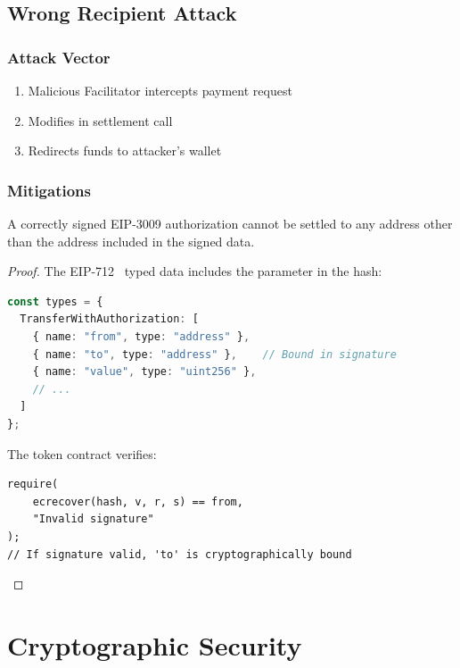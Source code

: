 \subsection{Wrong Recipient Attack}

\subsubsection{Attack Vector}

\begin{enumerate}
    \item Malicious Facilitator intercepts payment request
    \item Modifies  in settlement call
    \item Redirects funds to attacker's wallet
\end{enumerate}

\subsubsection{Mitigations}

\begin{theorem}
A correctly signed EIP-3009 authorization cannot be settled to any address other than the  address included in the signed data.
\end{theorem}

\begin{proof}
The EIP-712~\cite{eip712} typed data includes the  parameter in the hash:

\begin{lstlisting}[language=typescript]
const types = {
  TransferWithAuthorization: [
    { name: "from", type: "address" },
    { name: "to", type: "address" },    // Bound in signature
    { name: "value", type: "uint256" },
    // ...
  ]
};
\end{lstlisting}

The token contract verifies:
\begin{lstlisting}[language=solidity]
require(
    ecrecover(hash, v, r, s) == from,
    "Invalid signature"
);
// If signature valid, 'to' is cryptographically bound
\end{lstlisting}
\end{proof}

\section{Cryptographic Security}
\label{sec:crypto-security}

